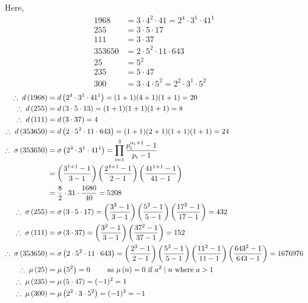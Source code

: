 \documentclass[12pt,class=book,crop=false]{standalone}
\begin{document}
\begin{soln}
    Here,
    \begin{align*}
        1968&=3\cdot 4^2\cdot 41=2^4\cdot 3^1 \cdot 41^1\\
        255&=3\cdot 5\cdot 17\\
        111&=3\cdot 37\\
        353650&=2\cdot 5^2\cdot 11\cdot 643\\
        25&=5^2\\
        235&=5\cdot 47\\
        300&=3\cdot 4\cdot 5^2=2^2\cdot 3^1\cdot 5^2
    \end{align*}
    \begin{align*}
        \therefore\; d\left( 1968 \right)&=d\left( 2^4\cdot 3^1 \cdot 41^1 \right)=(1+1)(4+1)(1+1)=20\\
        \therefore\; d\left( 255 \right)&=d\left( 3\cdot 5 \cdot 13 \right)=(1+1)(1+1)(1+1)=8\\
        \therefore\; d\left( 111 \right)&=d\left( 3\cdot 37 \right)=4\\
        \therefore\; d\left( 353650 \right)&=d\left( 2\cdot 5^2\cdot 11\cdot 643 \right)=(1+1)(2+1)(1+1)(1+1)=24\\
        \therefore\; \sigma\left( 353650 \right)&=\sigma\left( 2^4\cdot 3^1 \cdot 41^1 \right)=\prod_{i=1}^3 \frac{p_i^{\alpha_i+1}-1}{p_i-1}\\
        &=\left( \frac{3^{1+1}-1}{3-1} \right)\left( \frac{2^{4+1}-1}{2-1} \right)\left( \frac{41^{1+1}-1}{41-1} \right)\\
        &=\frac{8}{2} \cdot 31 \cdot \frac{1680}{40}=5208\\
        \therefore\; \sigma\left( 255 \right)&=\sigma\left( 3\cdot 5 \cdot 17 \right)=\left( \frac{3^{2}-1}{3-1} \right)\left( \frac{5^{2}-1}{5-1} \right)\left( \frac{17^{2}-1}{17-1} \right)=432\\
        \therefore\; \sigma\left( 111 \right)&=\sigma\left( 3\cdot 37 \right)=\left( \frac{3^{2}-1}{3-1} \right)\left( \frac{37^{2}-1}{37-1} \right)=152\\
        \therefore\; \sigma\left( 353650 \right)&=\sigma\left( 2\cdot 5^2\cdot 11\cdot 643 \right)=\left( \frac{2^{3}-1}{2-1} \right)\left( \frac{5^{3}-1}{5-1} \right)\left( \frac{11^2-1}{11-1} \right)\left( \frac{643^2-1}{643-1} \right)=1676976\\
        \therefore\; \mu\left( 25 \right)&=\mu\left( 5^2 \right)=0 \qquad \text{ as } \mu\left( n \right)=0 \text{ if } a^2\mid n \text{ where } a>1\\
        \therefore\; \mu\left( 235 \right)&=\mu\left( 5\cdot 47 \right)=(-1)^2=1\\
        \therefore\; \mu\left( 300 \right)&=\mu\left( 2^2\cdot 3\cdot 5^2 \right)=(-1)^3=-1
    \end{align*}
\end{soln}
\end{document}
